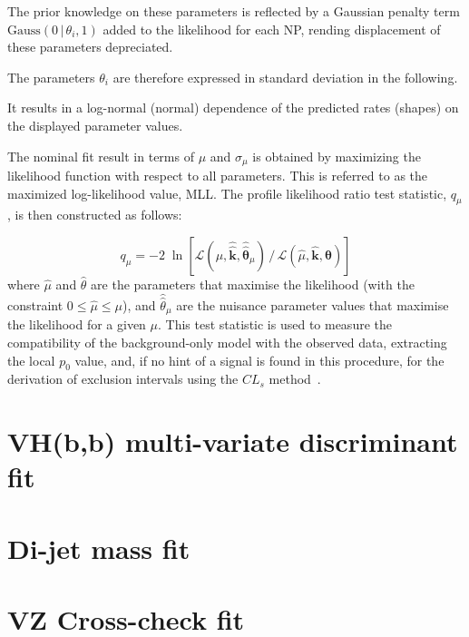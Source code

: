 The prior knowledge on these parameters is reflected by a Gaussian penalty term
$\text{Gauss}(0\,|\,\theta_i,1)$ added to the likelihood for each NP, rending
displacement of these parameters depreciated.

The parameters $\theta_i$ are therefore expressed in standard deviation in the
following.

It results in a log-normal (normal) dependence of the predicted rates (shapes)
on the displayed parameter values.


The nominal fit result in terms of $\mu$ and $\sigma_{\mu}$ is obtained by
maximizing the likelihood function with respect to all parameters.  This is
referred to as the maximized log-likelihood value, MLL. The profile likelihood
ratio test statistic, $q_\mu$, is then constructed as follows:

\begin{equation}
  q_\mu = - 2\; \ln \left[ \mathcal{L} (\mu, \hat{\hat{\mathbf{k}}}, \hat{\hat{\bm\theta}}_{\mu})\, / \, \mathcal{L} (\hat{\mu}, \hat{\mathbf{k}}, \hat{\bm\theta}) \right]
\end{equation}
where $\hat{\mu}$ and $\hat{\theta}$ are the parameters that maximise the
likelihood (with the constraint $0 \leq \hat{\mu} \leq \mu$), and
$\hat{\hat{\theta}}_\mu$ are the nuisance parameter values that maximise the
likelihood for a given $\mu$. This test statistic is used to measure the
compatibility of the background-only model with the observed data, extracting
the local $p_0$ value, and, if no hint of a signal is found in this procedure,
for the derivation of exclusion intervals using the $CL_s$
method~\cite{Cowan:2010js,Read:2002hq}.


\section{VH(b,b) multi-variate discriminant fit}%
\label{sec:mva-fit}
\section{Di-jet mass fit}%
\label{sec:mbb-fit}
\section{VZ Cross-check fit}%
\label{sec:mvadiboson-fit}